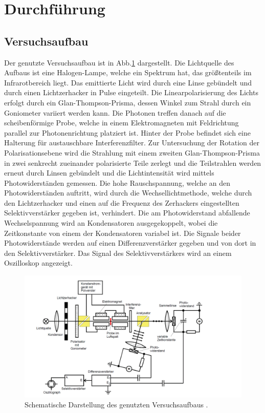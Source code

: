 \section{Durchführung}\label{durchfuehrung}
\subsection{Versuchsaufbau}
Der genutzte Versuchsaufbau ist in Abb.\ref{Aufbau} dargestellt. Die Lichtquelle des Aufbaus ist eine Halogen-Lampe, welche ein Spektrum hat, das größtenteils im Infrarotbereich liegt. Das emittierte Licht wird durch eine Linse gebündelt und durch einen Lichtzerhacker in Pulse eingeteilt.
Die Linearpolarisierung des Lichts erfolgt durch ein Glan-Thompson-Prisma, dessen Winkel zum Strahl durch ein Goniometer variiert werden kann. Die Photonen treffen danach auf die scheibenförmige Probe, welche in einem Elektromagneten mit Feldrichtung parallel zur Photonenrichtung platziert ist. Hinter der Probe befindet sich eine Halterung für austauschbare Interferenzfilter. Zur Untersuchung der Rotation der Polarisationsebene wird die Strahlung mit einem zweiten Glan-Thompson-Prisma in zwei senkrecht zueinander polarisierte Teile  zerlegt und die Teilstrahlen werden erneut durch Linsen gebündelt und die Lichtintensität wird mittels Photowiderständen gemessen. Die hohe Rauschspannung, welche an den Photowiderständen auftritt, wird durch die Wechsellichtmethode, welche durch den Lichtzerhacker und einen auf die Frequenz des Zerhackers eingestellten Selektivverstärker gegeben ist, verhindert. Die am Photowiderstand abfallende Wechselspannung wird an Kondensatoren ausgegekoppelt, wobei die Zeitkonstante von einem der Kondensatoren variabel ist. Die Signale beider Photowiderstände werden auf einen Differenzverstärker gegeben und von dort in den Selektivverstärker. Das Signal des Selektivverstärkers wird an einem Oszilloskop angezeigt.
\begin{figure}[H]
  \centering
  \includegraphics[width=1\textwidth]{bilder/aufbau.png}
  \caption{Schematische Darstellung des genutzten Versuchsaufbaus \cite{anleitung}.}
  \label{Aufbau}
\end{figure}
